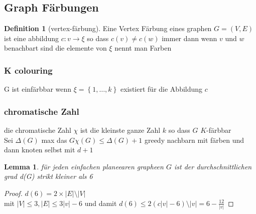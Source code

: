 \documentclass[a4paper]{article}
\newtheorem{lemma}[theorem]{Lemma}
\theoremstyle{definition}
\newtheorem{definition}{Definition}
\theoremstyle{remark}
\begin{document}
\subsection{Graph Färbungen}
\label{sub:graph_farbungen}

\begin{definition}[vertex-färbung]
  Eine Vertex Färbung eines graphen $G=(V,E)$ ist eine abbildung $c: v \rightarrow \xi $ so dass $c(v) \neq c(w)$ immer dann wenn $v$ und $w$ benachbart sind die elemente von $\xi$ nennt man Farben
  \subsubsection{K colouring}
  \label{ssub:k_colouring}
  
  G ist einfärbbar wenn $\xi= \left\{ 1,\dots,k \right\} $ existiert für die Abbildung $c$ 
  \subsubsection{chromatische Zahl}
  \label{ssub:chromatische_zahl}
  
  die chromatische Zahl $\chi$ ist die kleinste ganze Zahl $k$ so dass $G$  $K$-färbbar\\

  Sei $\Delta (G)$ max das $G \chi(G) \leq \Delta (G) +1$
  greedy nachbarn mit färben und dann knoten selbst mit $d+1$
  \begin{lemma}
    für jeden einfachen planeearen grapheen $G$ ist der durchschnittlichen grad d(G) strikt kleiner als 6
  \end{lemma}
  \begin{proof}
    $d(6)= 2\times |E| \setminus |V|$ \\
    mit $|V| \leq 3 , |E| \leq 3|v|-6$ und damit 
    $d(6) \leq 2(c|v|-6)\setminus |v|= 6-\frac{12}{|v|}$
  \end{proof}
\end{definition}
\end{document}
